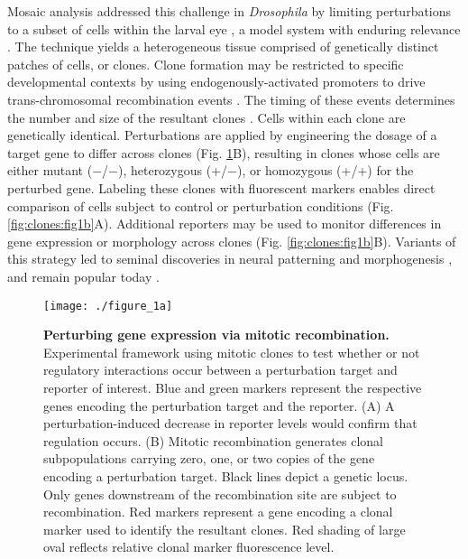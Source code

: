 Mosaic analysis addressed this challenge in \textit{Drosophila} by limiting perturbations to a subset of cells within the larval eye \cite{Xu1993,Xu2012}, a model system with enduring relevance \cite{Beira2016}. The technique yields a heterogeneous tissue comprised of genetically distinct patches of cells, or clones. Clone formation may be restricted to specific developmental contexts by using endogenously-activated promoters to drive trans-chromosomal recombination events \cite{Newsome2000,Theodosiou1998}. The timing of these events determines the number and size of the resultant clones \cite{Struhl1993}. Cells within each clone are genetically identical. Perturbations are applied by engineering the dosage of a target gene to differ across clones (Fig. \ref{fig:clones:fig1a}B), resulting in clones whose cells are either mutant ($-$/$-$), heterozygous (+/$-$), or homozygous (+/+) for the perturbed gene. Labeling these clones with fluorescent markers enables direct comparison of cells subject to control or perturbation conditions (Fig. \ref{fig:clones:fig1b}A). Additional reporters may be used to monitor differences in gene expression or morphology across clones (Fig. \ref{fig:clones:fig1b}B). Variants of this strategy led to seminal discoveries in neural patterning \cite{Halfar2001,Tomlinson2001,Yang2001} and morphogenesis \cite{Huang2005,Thompson2006}, and remain popular today \cite{Atkins2019,Enomoto2018,Germani2018}.

\begin{figure}[!h]
\centering
\texttt{[image: ./figure\_1a]}
\caption[Perturbing gene expression via mitotic recombination.]{\textbf{Perturbing gene expression via mitotic recombination.} Experimental framework using mitotic clones to test whether or not regulatory interactions occur between a perturbation target and reporter of interest. Blue and green markers represent the respective genes encoding the perturbation target and the reporter. (A) A perturbation-induced decrease in reporter levels would confirm that regulation occurs. (B) Mitotic recombination generates clonal subpopulations carrying zero, one, or two copies of the gene encoding a perturbation target. Black lines depict a genetic locus. Only genes downstream of the recombination site are subject to recombination. Red markers represent a gene encoding a clonal marker used to identify the resultant clones. Red shading of large oval reflects relative clonal marker fluorescence level.}
\label{fig:clones:fig1a}
\end{figure}

